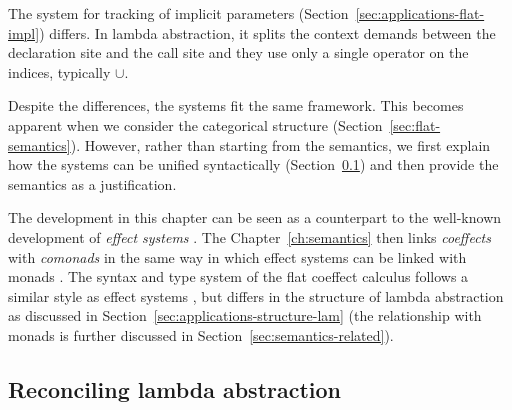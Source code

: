 The system for tracking of implicit parameters (Section~\ref{sec:applications-flat-impl})
differs. In lambda abstraction, it splits the context demands between the
declaration site and the call site and they use only a single operator on the indices, typically $\cup$.

Despite the differences, the systems fit the same framework. This becomes apparent when
we consider the categorical structure (Section~\ref{sec:flat-semantics}). However, rather than
starting from the semantics, we first explain how the systems can be unified syntactically
(Section~\ref{sec:flat-calculus-lambda}) and then provide the semantics as a justification.

The development in this chapter can be seen as a counterpart to the well-known development of
\emph{effect systems} \cite{effects-gifford}. The Chapter~\ref{ch:semantics} then links \emph{coeffects}
with \emph{comonads} in the same way in which effect systems can be linked with monads
\cite{monad-notions}. The syntax and type system of the flat coeffect calculus follows
a similar style as effect systems \cite{effects-polymorphic,effects-talpin-et-al}, but differs
in the structure of lambda abstraction as discussed in Section~\ref{sec:applications-structure-lam}
(the relationship with monads is further discussed in Section~\ref{sec:semantics-related}).


\subsection{Reconciling lambda abstraction}
\label{sec:flat-calculus-lambda}

